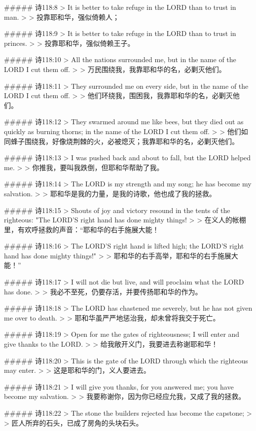 ##### 诗118:8
> It is better to take refuge in the LORD than to trust in man.
>
> 投靠耶和华，强似倚赖人；


##### 诗118:9
> It is better to take refuge in the LORD than to trust in princes.
>
> 投靠耶和华，强似倚赖王子。


##### 诗118:10
> All the nations surrounded me, but in the name of the LORD I cut them off.
>
> 万民围绕我，我靠耶和华的名，必剿灭他们。


##### 诗118:11
> They surrounded me on every side, but in the name of the LORD I cut them off.
>
> 他们环绕我，围困我，我靠耶和华的名，必剿灭他们。


##### 诗118:12
> They swarmed around me like bees, but they died out as quickly as burning thorns; in the name of the LORD I cut them off.
>
> 他们如同蜂子围绕我，好像烧荆棘的火，必被熄灭；我靠耶和华的名，必剿灭他们。


##### 诗118:13
> I was pushed back and about to fall, but the LORD helped me.
>
> 你推我，要叫我跌倒，但耶和华帮助了我。


##### 诗118:14
> The LORD is my strength and my song; he has become my salvation.
>
> 耶和华是我的力量，是我的诗歌，他也成了我的拯救。


##### 诗118:15
> Shouts of joy and victory resound in the tents of the righteous: "The LORD'S right hand has done mighty things!
>
> 在义人的帐棚里，有欢呼拯救的声音：“耶和华的右手施展大能！


##### 诗118:16
> The LORD'S right hand is lifted high; the LORD'S right hand has done mighty things!"
>
> 耶和华的右手高举，耶和华的右手施展大能！”


##### 诗118:17
> I will not die but live, and will proclaim what the LORD has done.
>
> 我必不至死，仍要存活，并要传扬耶和华的作为。


##### 诗118:18
> The LORD has chastened me severely, but he has not given me over to death.
>
> 耶和华虽严严地惩治我，却未曾将我交于死亡。


##### 诗118:19
> Open for me the gates of righteousness; I will enter and give thanks to the LORD.
>
> 给我敞开义门，我要进去称谢耶和华！


##### 诗118:20
> This is the gate of the LORD through which the righteous may enter.
>
> 这是耶和华的门，义人要进去。


##### 诗118:21
> I will give you thanks, for you answered me; you have become my salvation.
>
> 我要称谢你，因为你已经应允我，又成了我的拯救。


##### 诗118:22
> The stone the builders rejected has become the capstone;
>
> 匠人所弃的石头，已成了房角的头块石头。


